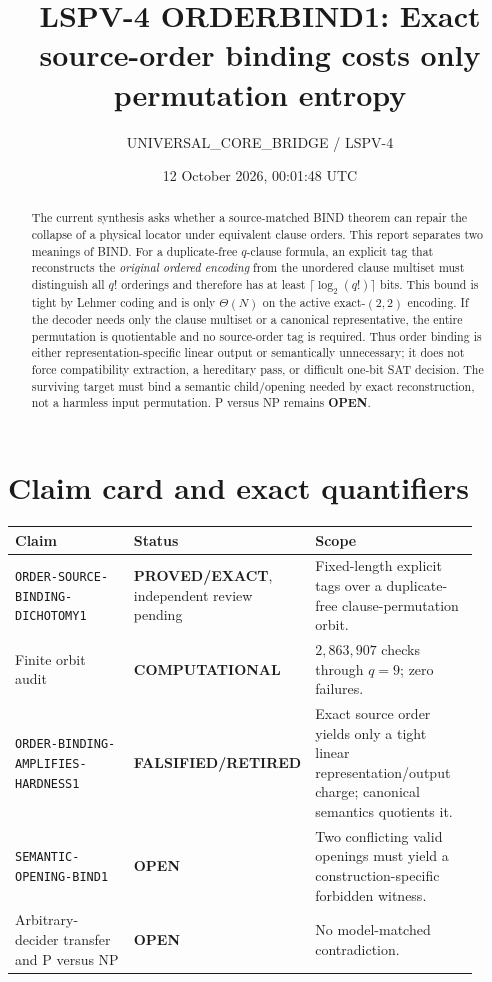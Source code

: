 \documentclass[11pt]{article}
\title{LSPV-4 ORDERBIND1: Exact source-order binding costs only permutation entropy}
\author{UNIVERSAL\_CORE\_BRIDGE / LSPV-4}
\date{12 October 2026, 00:01:48 UTC}
\newcommand{\EXACT}{\textbf{PROVED/EXACT}}
\newcommand{\COMP}{\textbf{COMPUTATIONAL}}
\newcommand{\OPEN}{\textbf{OPEN}}
\newcommand{\RETIRED}{\textbf{FALSIFIED/RETIRED}}
\begin{document}
\maketitle

\begin{abstract}
The current synthesis asks whether a source-matched BIND theorem can repair the
collapse of a physical locator under equivalent clause orders.  This report
separates two meanings of BIND.  For a duplicate-free $q$-clause formula, an
explicit tag that reconstructs the \emph{original ordered encoding} from the
unordered clause multiset must distinguish all $q!$ orderings and therefore
has at least $\lceil\log_2(q!)\rceil$ bits.  This bound is tight by Lehmer
coding and is only $\Theta(N)$ on the active exact-$(2,2)$ encoding.  If the
decoder needs only the clause multiset or a canonical representative, the
entire permutation is quotientable and no source-order tag is required.
Thus order binding is either representation-specific linear output or
semantically unnecessary; it does not force compatibility extraction, a
hereditary pass, or difficult one-bit SAT decision.  The surviving target must
bind a semantic child/opening needed by exact reconstruction, not a harmless
input permutation.  P versus NP remains \OPEN.
\end{abstract}

\section{Claim card and exact quantifiers}

\begin{center}\scriptsize
\begin{tabular}{>{\raggedright\arraybackslash}p{0.32\linewidth}>{\raggedright\arraybackslash}p{0.22\linewidth}>{\raggedright\arraybackslash}p{0.38\linewidth}}
\toprule
Claim & Status & Scope\\ \midrule
\texttt{ORDER-SOURCE-BINDING-DICHOTOMY1} & \EXACT, independent review pending & Fixed-length explicit tags over a duplicate-free clause-permutation orbit.\\
Finite orbit audit & \COMP & $2{,}863{,}907$ checks through $q=9$; zero failures.\\
\texttt{ORDER-BINDING-AMPLIFIES-HARDNESS1} & \RETIRED & Exact source order yields only a tight linear representation/output charge; canonical semantics quotients it.\\
\texttt{SEMANTIC-OPENING-BIND1} & \OPEN & Two conflicting valid openings must yield a construction-specific forbidden witness.\\
Arbitrary-decider transfer and P versus NP & \OPEN & No model-matched contradiction.\\
\bottomrule
\end{tabular}
\end{center}
\end{document}
